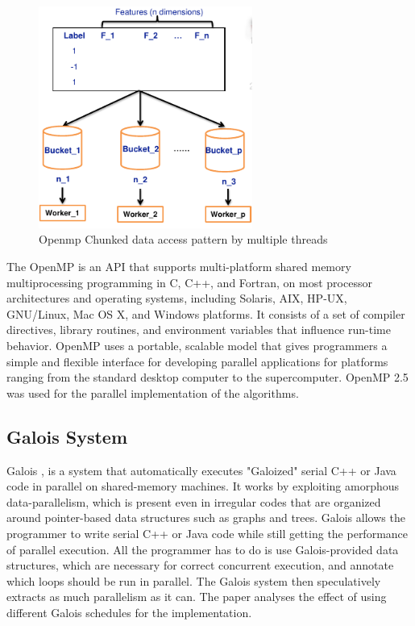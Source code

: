 \documentclass{sigplanconf}
\begin{document}
\begin{figure}[ht!]
\centering
\includegraphics[width=70mm]{openmp_chunked.png}
\caption{Openmp Chunked data access pattern by multiple threads}
\label{overflow}
\end{figure}
The OpenMP \cite{openmp} is an API that supports multi-platform shared memory multiprocessing programming in C, C++, and Fortran, on most processor architectures and operating systems, including Solaris, AIX, HP-UX, GNU/Linux, Mac OS X, and Windows platforms. It consists of a set of compiler directives, library routines, and environment variables that influence run-time behavior. OpenMP uses a portable, scalable model that gives programmers a simple and flexible interface for developing parallel applications for platforms ranging from the standard desktop computer to the supercomputer. OpenMP 2.5 was used for the parallel
implementation of the algorithms.

\subsection{Galois System}
Galois \cite{galois1}, \cite{galois2} is a system that automatically executes "Galoized" serial C++ or Java code in parallel on shared-memory machines. It works by exploiting amorphous data-parallelism, which is present even in irregular codes that are organized around pointer-based data structures such as graphs and trees. Galois allows the programmer to write serial C++ or Java code while still getting the performance of parallel execution. All the programmer has to do is use Galois-provided data structures, which are necessary for correct concurrent execution, and annotate which loops should be run in parallel. The Galois system then speculatively extracts as much parallelism as it can. The paper analyses the effect of using different Galois schedules for the implementation. 
\end{document}
